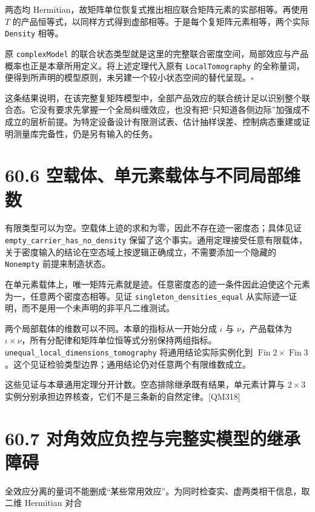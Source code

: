 \documentclass[
  11pt,
  oneside]{book}
\begin{document}
两态均 Hermitian，故矩阵单位恢复式推出相应联合矩阵元素的实部相等。再使用
\(T\)
的产品恒等式，以同样方式得到虚部相等。于是每个复矩阵元素相等，两个实际
\texttt{Density} 相等。

原 \texttt{complex\allowbreak Model}
的联合状态类型就是这里的完整联合密度空间，局部效应与产品概率也正是本章所用定义。将上述定理代入原有
\texttt{Local\allowbreak Tomography}
的全称量词，便得到所声明的模型原则，未另建一个较小状态空间的替代呈现。\(\square\)

这条结果说明，在该完整复矩阵模型中，全部产品效应的联合统计足以识别整个联合态。它没有要求先掌握一个全局纠缠效应，也没有把``只知道各侧边际''加强成不成立的层析前提。为特定设备设计有限测试表、估计抽样误差、控制病态重建或证明测量库完备性，仍是另有输入的任务。

\section{60.6 空载体、单元素载体与不同局部维数}

有限类型可以为空。空载体上迹的求和为零，因此不存在迹一密度态；具体见证
\texttt{empty\_\allowbreak carrier\_\allowbreak has\_\allowbreak no\_\allowbreak density}
保留了这个事实。通用定理接受任意有限载体，关于密度输入的结论在空态域上按逻辑正确成立，不需要添加一个隐藏的
\texttt{Nonempty} 前提来制造状态。

在单元素载体上，唯一矩阵元素就是迹。任意密度态的迹一条件因此迫使这个元素为一，任意两个密度态相等。见证
\texttt{singleton\_\allowbreak densities\_\allowbreak equal}
从实际迹一证明，而不是用一个未声明的非平凡二维测试。

两个局部载体的维数可以不同。本章的指标从一开始分成 \(\iota\) 与
\(\nu\)，产品载体为
\(\iota\times\nu\)，所有分配律和矩阵单位恒等式分别保持两组指标。\texttt{unequal\_\allowbreak local\_\allowbreak dimensions\_\allowbreak tomography}
将通用结论实际实例化到
\(\operatorname{Fin}2\times\operatorname{Fin}3\)。这个见证检验类型边界；通用结论仍对任意两个有限维数成立。

这些见证与本章通用定理分开计数。空态排除继承既有结果，单元素计算与
\(2\times3\) 实例分别承担边界核查，它们不是三条新的自然定律。{[}QM318{]}

\section{60.7 对角效应负控与完整实模型的继承障碍}

全效应分离的量词不能删成``某些常用效应''。为同时检查实、虚两类相干信息，取二维
Hermitian 对合
\end{document}
